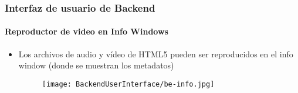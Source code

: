 
\begin{frame}[fragile]
	\frametitle{Interfaz de usuario de Backend}
	\framesubtitle{Reproductor de video en Info Windows}
	\begin{itemize}
		\item Los archivos de audio y vídeo de HTML5 pueden ser reproducidos en el info window
			(donde se muestran los metadatos)
		\begin{figure}
			\texttt{[image: BackendUserInterface/be-info.jpg]}
		\end{figure}

	\end{itemize}

\end{frame}

